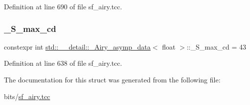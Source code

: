 Definition at line 690 of file sf\+\_\+airy.\+tcc.

\mbox{\label{structstd_1_1____detail_1_1__Airy__asymp__data_3_01float_01_4_ac0e59b83a90623587f20cdc32a9e7565}} 
\subsubsection{\texorpdfstring{\+\_\+\+S\+\_\+max\+\_\+cd}{\_S\_max\_cd}}
{\footnotesize\ttfamily constexpr int \hyperlink{structstd_1_1____detail_1_1__Airy__asymp__data}{std\+::\+\_\+\+\_\+detail\+::\+\_\+\+Airy\+\_\+asymp\+\_\+data}$<$ float $>$\+::\+\_\+\+S\+\_\+max\+\_\+cd = 43\hspace{0.3cm}{\ttfamily [static]}}



Definition at line 638 of file sf\+\_\+airy.\+tcc.



The documentation for this struct was generated from the following file\+:\begin{DoxyCompactItemize}
\item 
bits/\hyperlink{sf__airy_8tcc}{sf\+\_\+airy.\+tcc}\end{DoxyCompactItemize}
